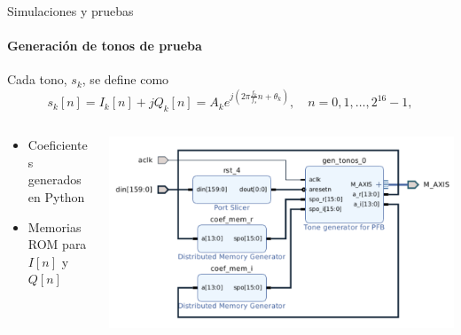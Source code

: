 \documentclass[ignorenonframetext,12pt]{beamer}
\begin{document}
\begin{frame}{Simulaciones y pruebas}
				\framesubtitle{Generación de tonos de prueba}

				Cada tono, $s_k$, se define como
				\begin{equation*}\label{eq:probe_signal}
								s_k[n] = I_k[n] + jQ_k[n] = A_k e^{j\left(2\pi \frac{f_k}{f_s}n +
								\theta_k \right)},\quad n = 0,1,\ldots,2^{16}-1,
				\end{equation*}
				\begin{columns}
								\begin{column}{0.4\textwidth}
												\begin{itemize}
																\item Coeficientes generados en Python 
																\item Memorias ROM para $I[n]$ y $Q[n]$
												\end{itemize}
								\end{column}
								\begin{column}{0.6\textwidth}
												\includegraphics[width=1.2\textwidth]{gen_tonos_vivado}
								\end{column}
				\end{columns}
\end{frame}
\end{document}
